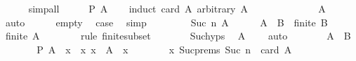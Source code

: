 \begin{isabellebody}
\ \ \ \ \isamarkupfalse%
\ simp{\isacharunderscore}{\kern0pt}all\isanewline
\ \ \isamarkupfalse%
\ \isamarkupfalse%
\ {\isachardoublequoteopen}P\ A{\isachardoublequoteclose}\isanewline
\ \ \isamarkupfalse%
\ {\isacharparenleft}{\kern0pt}induct\ {\isachardoublequoteopen}card\ A{\isachardoublequoteclose}\ arbitrary{\isacharcolon}{\kern0pt}\ A{\isacharparenright}{\kern0pt}\isanewline
\ \ \ \ \isamarkupfalse%
\ {}\isanewline
\ \ \ \ \isamarkupfalse%
\ \isamarkupfalse%
\ {\isachardoublequoteopen}A\ {\isacharequal}{\kern0pt}\ {\isacharbraceleft}{\kern0pt}{\isacharbraceright}{\kern0pt}{\isachardoublequoteclose}\ \isamarkupfalse%
\ auto\isanewline
\ \ \ \ \isamarkupfalse%
\ empty\ \isamarkupfalse%
\ {\isacharquery}{\kern0pt}case\ \isamarkupfalse%
\ simp\isanewline
\ \ \isamarkupfalse%
\isanewline
\ \ \ \ \isamarkupfalse%
\ {\isacharparenleft}{\kern0pt}Suc\ n\ A{\isacharparenright}{\kern0pt}\isanewline
\ \ \ \ \isamarkupfalse%
\ {\isacartoucheopen}A\ {\isasymsubseteq}\ B{\isacartoucheclose}\ \ {\isacartoucheopen}finite\ B{\isacartoucheclose}\ \isamarkupfalse%
\ {\isachardoublequoteopen}finite\ A{\isachardoublequoteclose}\isanewline
\ \ \ \ \ \ \isamarkupfalse%
\ {\isacharparenleft}{\kern0pt}rule\ finite{\isacharunderscore}{\kern0pt}subset{\isacharparenright}{\kern0pt}\isanewline
\ \ \ \ \isamarkupfalse%
\ \isamarkupfalse%
\ Suc{\isachardot}{\kern0pt}hyps\ \isamarkupfalse%
\ {\isachardoublequoteopen}A\ {\isasymnoteq}\ {\isacharbraceleft}{\kern0pt}{\isacharbraceright}{\kern0pt}{\isachardoublequoteclose}\ \isamarkupfalse%
\ auto\isanewline
\ \ \ \ \isamarkupfalse%
\ \isamarkupfalse%
\ {\isacartoucheopen}A\ {\isasymsubseteq}\ B{\isacartoucheclose}\isanewline
\ \ \ \ \isamarkupfalse%
\ \isamarkupfalse%
\ {\isachardoublequoteopen}P\ {\isacharparenleft}{\kern0pt}A\ {\isacharminus}{\kern0pt}\ {\isacharbraceleft}{\kern0pt}x{\isacharbraceright}{\kern0pt}{\isacharparenright}{\kern0pt}{\isachardoublequoteclose}\ \ x{\isacharcolon}{\kern0pt}\ {\isachardoublequoteopen}x\ {\isasymin}\ A{\isachardoublequoteclose}\ \ x\isanewline
\ \ \ \ \ \ \isamarkupfalse%
\ x\ Suc{\isachardot}{\kern0pt}prems\ {\isacartoucheopen}Suc\ n\ {\isacharequal}{\kern0pt}\ card\ A{\isacartoucheclose}\ \isamarkupfalse%

\end{isabellebody}
